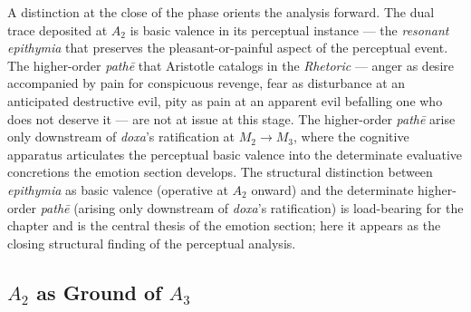 A distinction at the close of the phase orients the analysis forward. The dual trace deposited at $A_2$ is basic valence in its perceptual instance --- the \textit{resonant epithymia} that preserves the pleasant-or-painful aspect of the perceptual event. The higher-order \textit{pathē} that Aristotle catalogs in the \textit{Rhetoric} --- anger as desire accompanied by pain for conspicuous revenge, fear as disturbance at an anticipated destructive evil, pity as pain at an apparent evil befalling one who does not deserve it --- are not at issue at this stage. The higher-order \textit{pathē} arise only downstream of \textit{doxa}'s ratification at $M_2 \rightarrow M_3$, where the cognitive apparatus articulates the perceptual basic valence into the determinate evaluative concretions the emotion section develops. The structural distinction between \textit{epithymia} as basic valence (operative at $A_2$ onward) and the determinate higher-order \textit{pathē} (arising only downstream of \textit{doxa}'s ratification) is load-bearing for the chapter and is the central thesis of the emotion section; here it appears as the closing structural finding of the perceptual analysis.

\subsection{$A_2$ as Ground of $A_3$}

